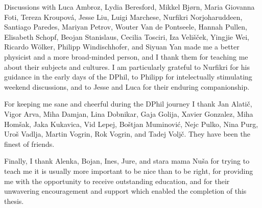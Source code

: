 \begin{acknowledgements}
Discussions with Luca Ambroz, Lydia Beresford, Mikkel Bj{\o}rn, Maria Giovanna
Foti, Tereza Kroupov\'a, Jesse Liu, Luigi Marchese, Nurfikri Norjoharuddeen,
Santiago Paredes, Mariyan Petrov, Wouter Van de Pontseele, Hannah Pullen,
Elisabeth Schopf, Beojan Stanislaus, Cecilia Tosciri, Iza Veli\v{s}\v{c}ek,
Yingjie Wei, Ricardo W\"olker, Philipp Windischhofer, and Siyuan Yan made me a
better physicist and a more broad-minded person, and I thank them for teaching
me about their subjects and cultures. I am particularly grateful to Nurfikri
for his guidance in the early days of the DPhil, to Philipp for intelectually
stimulating weekend discussions, and to Jesse and Luca for their enduring
companionship.

For keeping me sane and cheerful during the DPhil journey I thank Jan
Alati\v{c}, Vigor Arva, Miha Damjan, Lina Dobnikar, Gaja Golija, Xavier
Gonzalez, Miha Hom\v{s}ak, Jaka Kukavica, Vid Lepej, Bo\v{s}tjan Muminovi\'{c},
Nejc Pulko, Nina Purg, Uro\v{s} Vadlja, Martin Vogrin, Rok Vogrin, and Tadej
Volj\v{c}. They have been the finest of friends.

Finally, I thank Alenka, Bojan, Ines, Jure, and stara mama Nu\v{s}a for
trying to teach me it is usually more important to be nice than to be right,
for providing me with the opportunity to receive outstanding education, and
for their unwavering encouragement and support which enabled the completion
of this thesis.

\end{acknowledgements}

